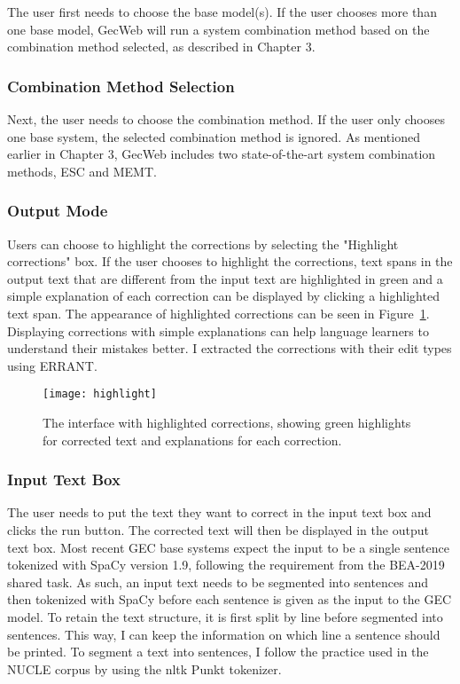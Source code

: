 The user first needs to choose the base model(s).
If the user chooses more than one base model, GecWeb will run a system combination method based on the combination method selected, as described in Chapter 3.

\subsubsection{Combination Method Selection}

Next, the user needs to choose the combination method.
If the user only chooses one base system, the selected combination method is ignored.
As mentioned earlier in Chapter 3, GecWeb includes two state-of-the-art system combination methods, ESC and MEMT.

\subsubsection{Output Mode}

Users can choose to highlight the corrections by selecting the "Highlight corrections" box.
If the user chooses to highlight the corrections, text spans in the output text that are different from the input text are highlighted in green and a simple explanation of each correction can be displayed by clicking a highlighted text span.
The appearance of highlighted corrections can be seen in Figure~\ref{fig:highlight}.
Displaying corrections with simple explanations can help language learners to understand their mistakes better.
I extracted the corrections with their edit types using ERRANT.

\begin{figure}[htbp]
  \begin{center}
    \texttt{[image: highlight]}
  \end{center}
  \caption{The interface with highlighted corrections, showing green highlights for corrected text and explanations for each correction.}\label{fig:highlight} \end{figure}

\subsubsection{Input Text Box}

The user needs to put the text they want to correct in the input text box and clicks the run button.
The corrected text will then be displayed in the output text box.
Most recent GEC base systems expect the input to be a single sentence tokenized with SpaCy version 1.9, following the requirement from the BEA-2019 shared task.
As such, an input text needs to be segmented into sentences and then tokenized with SpaCy before each sentence is given as the input to the GEC model.
To retain the text structure, it is first split by line before segmented into sentences.
This way, I can keep the information on which line a sentence should be printed.
To segment a text into sentences, I follow the practice used in the NUCLE corpus by using the nltk Punkt
tokenizer.

